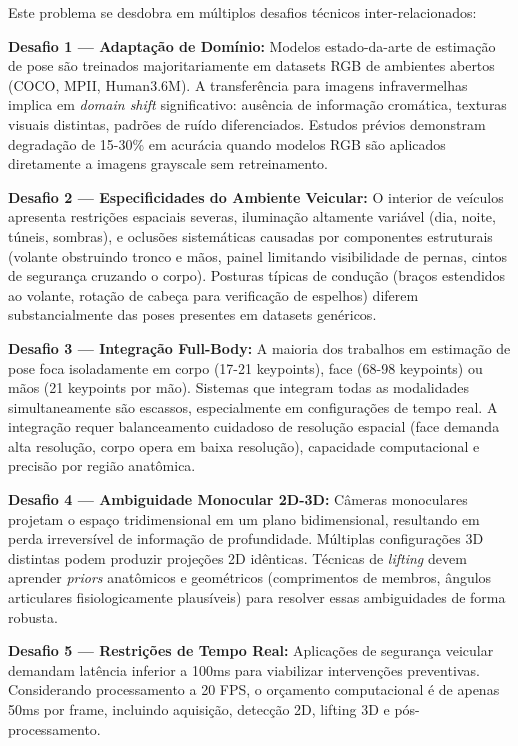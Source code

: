 \documentclass[12pt, a4paper]{article}
\begin{document}
Este problema se desdobra em múltiplos desafios técnicos inter-relacionados:

\textbf{Desafio 1 --- Adaptação de Domínio:} Modelos estado-da-arte de estimação de pose são treinados majoritariamente em datasets RGB de ambientes abertos (COCO, MPII, Human3.6M). A transferência para imagens infravermelhas implica em \textit{domain shift} significativo: ausência de informação cromática, texturas visuais distintas, padrões de ruído diferenciados. Estudos prévios demonstram degradação de 15-30\% em acurácia quando modelos RGB são aplicados diretamente a imagens grayscale sem retreinamento.

\textbf{Desafio 2 --- Especificidades do Ambiente Veicular:} O interior de veículos apresenta restrições espaciais severas, iluminação altamente variável (dia, noite, túneis, sombras), e oclusões sistemáticas causadas por componentes estruturais (volante obstruindo tronco e mãos, painel limitando visibilidade de pernas, cintos de segurança cruzando o corpo). Posturas típicas de condução (braços estendidos ao volante, rotação de cabeça para verificação de espelhos) diferem substancialmente das poses presentes em datasets genéricos.

\textbf{Desafio 3 --- Integração Full-Body:} A maioria dos trabalhos em estimação de pose foca isoladamente em corpo (17-21 keypoints), face (68-98 keypoints) ou mãos (21 keypoints por mão). Sistemas que integram todas as modalidades simultaneamente são escassos, especialmente em configurações de tempo real. A integração requer balanceamento cuidadoso de resolução espacial (face demanda alta resolução, corpo opera em baixa resolução), capacidade computacional e precisão por região anatômica.

\textbf{Desafio 4 --- Ambiguidade Monocular 2D-3D:} Câmeras monoculares projetam o espaço tridimensional em um plano bidimensional, resultando em perda irreversível de informação de profundidade. Múltiplas configurações 3D distintas podem produzir projeções 2D idênticas. Técnicas de \textit{lifting} devem aprender \textit{priors} anatômicos e geométricos (comprimentos de membros, ângulos articulares fisiologicamente plausíveis) para resolver essas ambiguidades de forma robusta.

\textbf{Desafio 5 --- Restrições de Tempo Real:} Aplicações de segurança veicular demandam latência inferior a 100ms para viabilizar intervenções preventivas. Considerando processamento a 20 FPS, o orçamento computacional é de apenas 50ms por frame, incluindo aquisição, detecção 2D, lifting 3D e pós-processamento.
\end{document}
